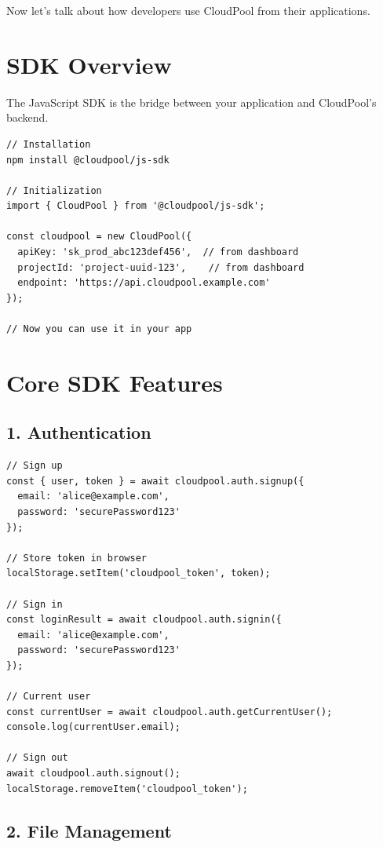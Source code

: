 \documentclass[11pt,a4paper]{report}
\begin{document}
Now let's talk about how developers use CloudPool from their applications.


\chapter{SDK Overview}


The JavaScript SDK is the bridge between your application and CloudPool's backend.

\begin{lstlisting}[language=text]
// Installation
npm install @cloudpool/js-sdk

// Initialization
import { CloudPool } from '@cloudpool/js-sdk';

const cloudpool = new CloudPool({
  apiKey: 'sk_prod_abc123def456',  // from dashboard
  projectId: 'project-uuid-123',    // from dashboard
  endpoint: 'https://api.cloudpool.example.com'
});

// Now you can use it in your app
\end{lstlisting}


\chapter{Core SDK Features}



\section{1. Authentication}


\begin{lstlisting}[language=text]
// Sign up
const { user, token } = await cloudpool.auth.signup({
  email: 'alice@example.com',
  password: 'securePassword123'
});

// Store token in browser
localStorage.setItem('cloudpool_token', token);

// Sign in
const loginResult = await cloudpool.auth.signin({
  email: 'alice@example.com',
  password: 'securePassword123'
});

// Current user
const currentUser = await cloudpool.auth.getCurrentUser();
console.log(currentUser.email);

// Sign out
await cloudpool.auth.signout();
localStorage.removeItem('cloudpool_token');
\end{lstlisting}


\section{2. File Management}
\end{document}
